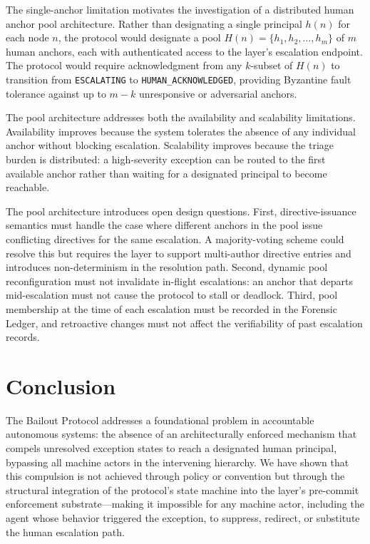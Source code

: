The single-anchor limitation motivates the investigation of a distributed human anchor pool architecture. Rather than designating a single principal $h(n)$ for each node $n$, the protocol would designate a pool $H(n) = \{h_1, h_2, \ldots, h_m\}$ of $m$ human anchors, each with authenticated access to the \fact{} layer's escalation endpoint. The protocol would require acknowledgment from any $k$-subset of $H(n)$ to transition from \texttt{ESCALATING} to \texttt{HUMAN\_ACKNOWLEDGED}, providing Byzantine fault tolerance against up to $m - k$ unresponsive or adversarial anchors.

The pool architecture addresses both the availability and scalability limitations. Availability improves because the system tolerates the absence of any individual anchor without blocking escalation. Scalability improves because the triage burden is distributed: a high-severity exception can be routed to the first available anchor rather than waiting for a designated principal to become reachable.

The pool architecture introduces open design questions. First, directive-issuance semantics must handle the case where different anchors in the pool issue conflicting directives for the same escalation. A majority-voting scheme could resolve this but requires the \fact{} layer to support multi-author directive entries and introduces non-determinism in the resolution path. Second, dynamic pool reconfiguration must not invalidate in-flight escalations: an anchor that departs mid-escalation must not cause the protocol to stall or deadlock. Third, pool membership at the time of each escalation must be recorded in the Forensic Ledger, and retroactive changes must not affect the verifiability of past escalation records.

\section{Conclusion}\label{sec:conclusion}

The Bailout Protocol addresses a foundational problem in accountable autonomous systems: the absence of an architecturally enforced mechanism that compels unresolved exception states to reach a designated human principal, bypassing all machine actors in the intervening hierarchy. We have shown that this compulsion is not achieved through policy or convention but through the structural integration of the protocol's state machine into the \fact{} layer's pre-commit enforcement substrate---making it impossible for any machine actor, including the agent whose behavior triggered the exception, to suppress, redirect, or substitute the human escalation path.

